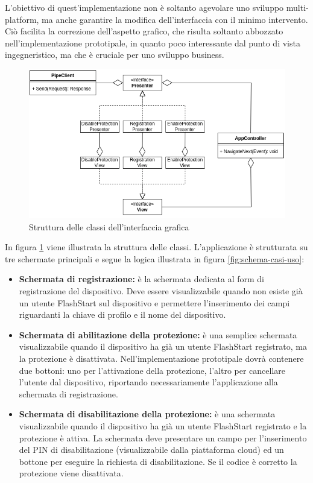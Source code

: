 \documentclass[12pt,a4paper,openright,twoside]{book}
\newcommand{\itemdef}[1]{\item \textbf{#1}}
\begin{document}
L'obiettivo di quest'implementazione non è soltanto agevolare uno sviluppo multi-platform, ma anche garantire la modifica dell'interfaccia con il minimo intervento.
Ciò facilita la correzione dell'aspetto grafico, che risulta soltanto abbozzato nell'implementazione prototipale, in quanto poco interessante dal punto di vista ingegneristico, ma che è cruciale per uno sviluppo business.
\begin{figure}[H]
	\centering
	\includegraphics[width=1.0\textwidth]{figures/mvp-classes.png}
	\caption{Struttura delle classi dell'interfaccia grafica}
	\label{fig:mvp-struttura-classi}
\end{figure}
In figura \ref{fig:mvp-struttura-classi} viene illustrata la struttura delle classi.
L'applicazione è strutturata su tre schermate principali e segue la logica illustrata in figura \ref{fig:schema-casi-uso}:
\begin{itemize}
	\itemdef{Schermata di registrazione:} è la schermata dedicata al form di registrazione del dispositivo.
	Deve essere visualizzabile quando non esiste già un utente FlashStart sul dispositivo e permettere l'inserimento dei campi riguardanti la chiave di profilo e il nome del dispositivo.
	
	\itemdef{Schermata di abilitazione della protezione:} è una semplice schermata visualizzabile quando il dispositivo ha già un utente FlashStart registrato, ma la protezione è disattivata.
	Nell'implementazione prototipale dovrà contenere due bottoni: uno per l'attivazione della protezione, l'altro per cancellare l'utente dal dispositivo, riportando necessariamente l'applicazione alla schermata di registrazione.
	
	\itemdef{Schermata di disabilitazione della protezione:} è una schermata visualizzabile quando il dispositivo ha già un utente FlashStart registrato e la protezione è attiva.
	La schermata deve presentare un campo per l'inserimento del PIN di disabilitazione (visualizzabile dalla piattaforma cloud) ed un bottone per eseguire la richiesta di disabilitazione.
	Se il codice è corretto la protezione viene disattivata.
\end{itemize}
\end{document}
